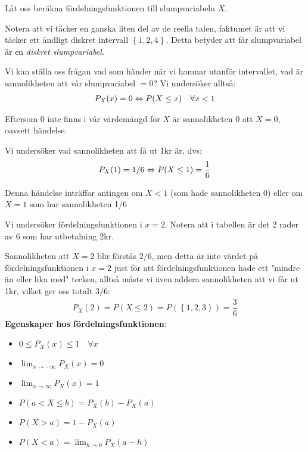 \par\bigskip
\noindent Låt oss beräkna fördelningsfunktionen till slumpvariabeln $X$.\par
\noindent Notera att vi täcker en ganska liten del av de reella talen, faktumet är att vi täcker ett ändligt diskret intervall $\left\{1,2,4\right\}$. Detta betyder att får slumpvariabel är en \textit{diskret slumpvariabel}.\par
\noindent Vi kan ställa oss frågan vad som händer när vi hamnar utanför intervallet, vad är sannolikheten att vår slumpvariabel $=0$? Vi undersöker alltså:
\begin{equation*}
  \begin{gathered}
    P_X(x) = 0\Leftrightarrow P(X\leq x)\quad\forall x<1
  \end{gathered}
\end{equation*}\par
\noindent Eftersom $0$ inte finns i vår värdemängd för $X$ är sannolikheten 0 att $X=0$, oavsett händelse.
\par\bigskip
\noindent Vi undersöker vad sannolikheten att få ut 1kr är, dvs:
\begin{equation*}
  \begin{gathered}
    P_X(1) = 1/6\Leftrightarrow P(X\leq1) = \dfrac{1}{6}
  \end{gathered}
\end{equation*}\par
\noindent Denna händelse inträffar antingen om $X<1$ (som hade sannolikheten 0) eller om $X=1$ som har sannolikheten 1/6
\par\bigskip
\noindent Vi undersöker fördelningsfunktionen i $x = 2$. Notera att i tabellen är det 2 rader av 6 som har utbetalning 2kr.\par
\noindent Sannolikheten att $X=2$ blir förstås $2/6$, men detta är inte värdet på fördelningsfunktionen i $x=2$ just för att fördelningsfunktionen hade ett "mindre än eller lika med" tecken, alltså måste vi även addera sannolikheten att vi får ut 1kr, vilket ger oss totalt $3/6$:
\begin{equation*}
  \begin{gathered}
    P_X(2) = P(X\leq 2) = P(\left\{1,2,3\right\}) = \dfrac{3}{6}
  \end{gathered}
\end{equation*}
\newpage
\noindent\textbf{Egenskaper hos fördelningsfunktionen}:
\begin{itemize}
  \item $0\leq P_X(x)\leq 1\quad\forall x$
  \item $\lim_{x\to-\infty}P_X(x) = 0$
  \item $\lim_{x\to\infty}P_X(x) = 1$
  \item $P(a<X\leq b) = P_X(b)-P_X(a)$
  \item $P(X>a) = 1-P_X(a)$
  \item $P(X<a) = \lim_{h\to0}P_X(a-h)$
\end{itemize}

